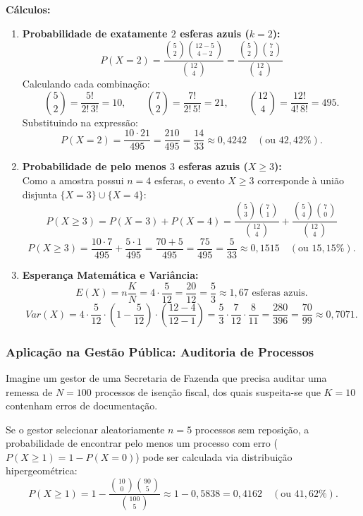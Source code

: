 \newpage
\textbf{Cálculos:}
\begin{enumerate}
    \item[a)] \textbf{Probabilidade de exatamente $2$ esferas azuis ($k = 2$):}
    \[
    P(X = 2) = \frac{\binom{5}{2}\binom{12-5}{4-2}}{\binom{12}{4}} = \frac{\binom{5}{2}\binom{7}{2}}{\binom{12}{4}}
    \]
    Calculando cada combinação:
    \[
    \binom{5}{2} = \frac{5!}{2!\,3!} = 10, \qquad \binom{7}{2} = \frac{7!}{2!\,5!} = 21, \qquad \binom{12}{4} = \frac{12!}{4!\,8!} = 495.
    \]
    Substituindo na expressão:
    \[
    P(X = 2) = \frac{10 \cdot 21}{495} = \frac{210}{495} = \frac{14}{33} \approx 0,4242 \quad (\text{ou } 42,42\%).
    \]

    \item[b)] \textbf{Probabilidade de pelo menos $3$ esferas azuis ($X \ge 3$):} \\
    Como a amostra possui $n = 4$ esferas, o evento $X \ge 3$ corresponde à união disjunta $\{X = 3\} \cup \{X = 4\}$:
    \[
    P(X \ge 3) = P(X = 3) + P(X = 4) = \frac{\binom{5}{3}\binom{7}{1}}{\binom{12}{4}} + \frac{\binom{5}{4}\binom{7}{0}}{\binom{12}{4}}
    \]
    \[
    P(X \ge 3) = \frac{10 \cdot 7}{495} + \frac{5 \cdot 1}{495} = \frac{70 + 5}{495} = \frac{75}{495} = \frac{5}{33} \approx 0,1515 \quad (\text{ou } 15,15\%).
    \]

    \item[c)] \textbf{Esperança Matemática e Variância:}
    \[
    E(X) = n\frac{K}{N} = 4 \cdot \frac{5}{12} = \frac{20}{12} = \frac{5}{3} \approx 1,67 \text{ esferas azuis.}
    \]
    \[
    Var(X) = 4 \cdot \frac{5}{12} \cdot \left(1 - \frac{5}{12}\right) \cdot \left(\frac{12 - 4}{12 - 1}\right) = \frac{5}{3} \cdot \frac{7}{12} \cdot \frac{8}{11} = \frac{280}{396} = \frac{70}{99} \approx 0,7071.
    \]
\end{enumerate}

\subsubsection*{Aplicação na Gestão Pública: Auditoria de Processos}

Imagine um gestor de uma Secretaria de Fazenda que precisa auditar uma remessa de $N = 100$ processos de isenção fiscal, dos quais suspeita-se que $K = 10$ contenham erros de documentação. \vskip0.3cm

Se o gestor selecionar aleatoriamente $n = 5$ processos sem reposição, a probabilidade de encontrar pelo menos um processo com erro ($P(X \ge 1) = 1 - P(X = 0)$) pode ser calculada via distribuição hipergeométrica:
\[
P(X \ge 1) = 1 - \frac{\binom{10}{0}\binom{90}{5}}{\binom{100}{5}} \approx 1 - 0,5838 = 0,4162 \quad (\text{ou } 41,62\%).
\]

